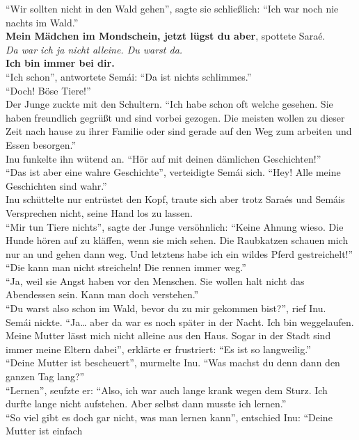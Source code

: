 ``Wir sollten nicht in den Wald gehen'', sagte sie schließlich: ``Ich war noch nie nachts im 
Wald.''\\
\textbf{Mein Mädchen im Mondschein, jetzt lügst du aber}, spottete Saraé.\\
\textit{Da war ich ja nicht alleine. Du warst da.}\\
\textbf{Ich bin immer bei dir.}\\
``Ich schon'', antwortete Semái: ``Da ist nichts schlimmes.''\\
``Doch! Böse Tiere!''\\
Der Junge zuckte mit den Schultern. ``Ich habe schon oft welche gesehen. Sie haben freundlich 
gegrüßt und sind vorbei gezogen. Die meisten wollen zu dieser Zeit nach hause zu ihrer Familie oder 
sind gerade auf den Weg zum arbeiten und Essen besorgen.''\\
Inu funkelte ihn wütend an. ``Hör auf mit deinen dämlichen Geschichten!''\\
``Das ist aber eine wahre Geschichte'', verteidigte Semái sich. ``Hey! Alle meine Geschichten sind 
wahr.''\\
Inu schüttelte nur entrüstet den Kopf, traute sich aber trotz Saraés und Semáis Versprechen nicht, 
seine Hand los zu lassen. \\
``Mir tun Tiere nichts'', sagte der Junge versöhnlich: ``Keine Ahnung wieso. Die Hunde hören auf zu 
kläffen, wenn sie mich sehen. Die Raubkatzen schauen mich nur an und gehen dann weg. Und letztens 
habe ich ein wildes Pferd gestreichelt!''\\
``Die kann man nicht streicheln! Die rennen immer weg.''\\
``Ja, weil sie Angst haben vor den Menschen. Sie wollen halt nicht das Abendessen sein. Kann man 
doch verstehen.''\\
``Du warst also schon im Wald, bevor du zu mir gekommen bist?'', rief Inu.\\
Semái nickte. ``Ja… aber da war es noch später in der Nacht. Ich bin weggelaufen. Meine Mutter 
lässt mich nicht alleine aus den Haus. Sogar in der Stadt sind immer meine Eltern dabei'', erklärte 
er frustriert: ``Es ist so langweilig.''\\
``Deine Mutter ist bescheuert'', murmelte Inu. ``Was machst du denn dann den ganzen Tag lang?''\\
``Lernen'', seufzte er: ``Also, ich war auch lange krank wegen dem Sturz. Ich durfte lange nicht 
aufstehen. Aber selbst dann musste ich lernen.''\\
``So viel gibt es doch gar nicht, was man lernen kann'', entschied Inu: ``Deine Mutter ist einfach 
